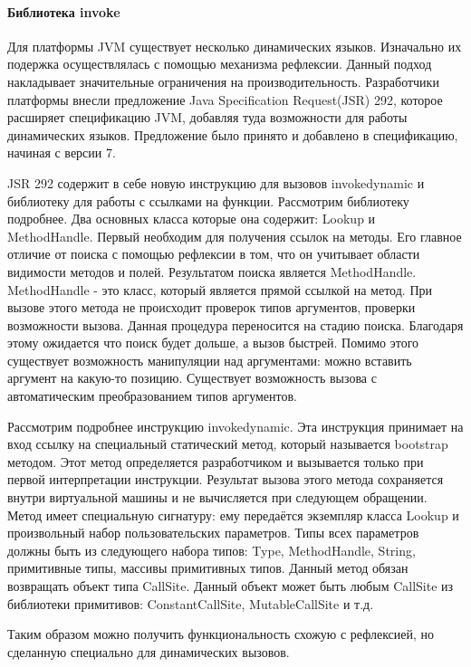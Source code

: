 \paragraph{Библиотека invoke}
Для платформы JVM существует несколько динамических языков. Изначально их подержка осуществлялась с помощью механизма рефлексии. Данный подход накладывает значительные ограничения на производительность. Разработчики платформы внесли предложение Java Specification Request(JSR) 292, которое расширяет спецификацию JVM, добавляя туда возможности для работы динамических языков\cite{jvm:jsr292}. Предложение было принято и добавлено в спецификацию, начиная с версии 7.

JSR 292 содержит в себе новую инструкцию для вызовов invokedynamic и библиотеку для работы с ссылками на функции. Рассмотрим библиотеку подробнее. Два основных класса которые она содержит: Lookup и MethodHandle. Первый необходим для получения ссылок на методы. Его главное отличие от поиска с помощью рефлексии в том, что он учитывает области видимости методов и полей. Результатом поиска является MethodHandle. MethodHandle - это класс, который является прямой ссылкой на метод. При вызове этого метода не происходит проверок типов аргументов, проверки возможности вызова. Данная процедура переносится на стадию поиска. Благодаря этому ожидается что поиск будет дольше, а вызов быстрей. Помимо этого существует возможность манипуляции над аргументами: можно вставить аргумент на какую-то позицию. Существует возможность вызова с автоматическим преобразованием типов аргументов.

Рассмотрим подробнее инструкцию invokedynamic. Эта инструкция принимает на вход ссылку на специальный статический метод, который называется bootstrap методом. Этот метод определяется разработчиком и вызывается только при первой интерпретации инструкции. Результат вызова этого метода сохраняется внутри виртуальной машины и не вычисляется при следующем обращении. Метод имеет специальную сигнатуру: ему передаётся экземпляр класса Lookup и произвольный набор пользовательских параметров. Типы всех параметров должны быть из следующего набора типов: Type, MethodHandle, String, примитивные типы, массивы примитивных типов. Данный метод обязан возвращать объект типа CallSite. Данный объект может быть любым CallSite из библиотеки примитивов: ConstantCallSite, MutableCallSite и т.д.

Таким образом можно получить функциональность схожую с рефлексией, но сделанную специально для динамических вызовов.